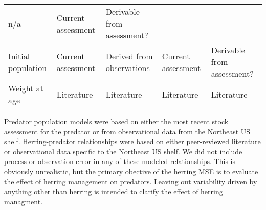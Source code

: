 \documentclass[]{article}
\begin{document}
\begin{longtable}[]{@{}lllll@{}}
\begin{minipage}[t]{0.17\columnwidth}
n/a\strut
\end{minipage} & \begin{minipage}[t]{0.17\columnwidth}\raggedright\strut
Current assessment\strut
\end{minipage} & \begin{minipage}[t]{0.17\columnwidth}\raggedright\strut
Derivable from assessment?\strut
\end{minipage}\tabularnewline
\begin{minipage}[t]{0.17\columnwidth}\raggedright\strut
Initial population\strut
\end{minipage} & \begin{minipage}[t]{0.17\columnwidth}\raggedright\strut
Current assessment\strut
\end{minipage} & \begin{minipage}[t]{0.17\columnwidth}\raggedright\strut
Derived from observations\strut
\end{minipage} & \begin{minipage}[t]{0.17\columnwidth}\raggedright\strut
Current assessment\strut
\end{minipage} & \begin{minipage}[t]{0.17\columnwidth}\raggedright\strut
Derivable from assessment?\strut
\end{minipage}\tabularnewline
\begin{minipage}[t]{0.17\columnwidth}\raggedright\strut
Weight at age\strut
\end{minipage} & \begin{minipage}[t]{0.17\columnwidth}\raggedright\strut
Literature\strut
\end{minipage} & \begin{minipage}[t]{0.17\columnwidth}\raggedright\strut
Literature\strut
\end{minipage} & \begin{minipage}[t]{0.17\columnwidth}\raggedright\strut
Literature\strut
\end{minipage} & \begin{minipage}[t]{0.17\columnwidth}\raggedright\strut
Literature\strut
\end{minipage}\tabularnewline
\bottomrule
\end{longtable}

Predator population models were based on either the most recent stock
assessment for the predator or from observational data from the
Northeast US shelf. Herring-predator relationships were based on either
peer-reviewed literature or observational data specific to the Northeast
US shelf. We did not include process or observation error in any of
these modeled relationships. This is obviously unrealistic, but the
primary obective of the herring MSE is to evaluate the effect of herring
management on predators. Leaving out variability driven by anything
other than herring is intended to clarify the effect of herring
managment.
\end{document}
